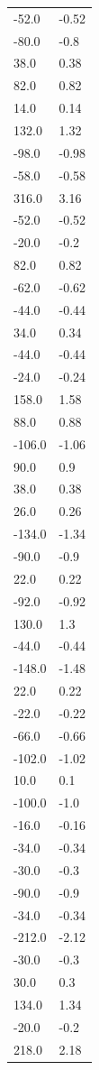 \begin{longtable}{ll}
-52.0 & -0.52 \\
-80.0 & -0.8 \\
38.0 & 0.38 \\
82.0 & 0.82 \\
14.0 & 0.14 \\
132.0 & 1.32 \\
-98.0 & -0.98 \\
-58.0 & -0.58 \\
316.0 & 3.16 \\
-52.0 & -0.52 \\
-20.0 & -0.2 \\
82.0 & 0.82 \\
-62.0 & -0.62 \\
-44.0 & -0.44 \\
34.0 & 0.34 \\
-44.0 & -0.44 \\
-24.0 & -0.24 \\
158.0 & 1.58 \\
88.0 & 0.88 \\
-106.0 & -1.06 \\
90.0 & 0.9 \\
38.0 & 0.38 \\
26.0 & 0.26 \\
-134.0 & -1.34 \\
-90.0 & -0.9 \\
22.0 & 0.22 \\
-92.0 & -0.92 \\
130.0 & 1.3 \\
-44.0 & -0.44 \\
-148.0 & -1.48 \\
22.0 & 0.22 \\
-22.0 & -0.22 \\
-66.0 & -0.66 \\
-102.0 & -1.02 \\
10.0 & 0.1 \\
-100.0 & -1.0 \\
-16.0 & -0.16 \\
-34.0 & -0.34 \\
-30.0 & -0.3 \\
-90.0 & -0.9 \\
-34.0 & -0.34 \\
-212.0 & -2.12 \\
-30.0 & -0.3 \\
30.0 & 0.3 \\
134.0 & 1.34 \\
-20.0 & -0.2 \\
218.0 & 2.18 \\

\end{longtable}
